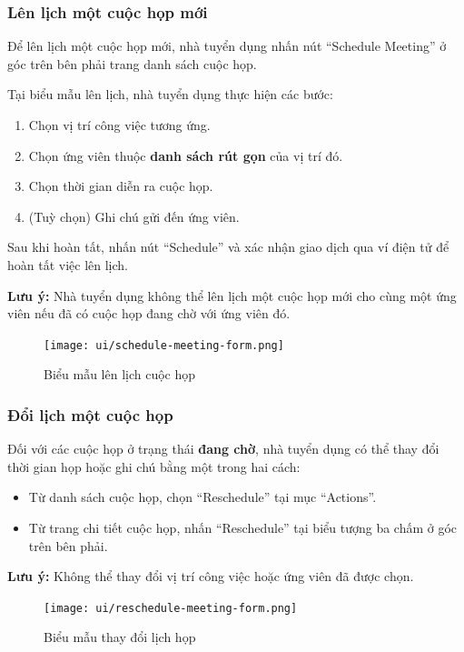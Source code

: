 \subsubsection{Lên lịch một cuộc họp mới}

Để lên lịch một cuộc họp mới, nhà tuyển dụng nhấn nút ``Schedule Meeting'' ở góc trên bên phải trang danh sách cuộc họp.

Tại biểu mẫu lên lịch, nhà tuyển dụng thực hiện các bước:
\begin{enumerate}
  \item Chọn vị trí công việc tương ứng.
  \item Chọn ứng viên thuộc \textbf{danh sách rút gọn} của vị trí đó.
  \item Chọn thời gian diễn ra cuộc họp.
  \item (Tuỳ chọn) Ghi chú gửi đến ứng viên.
\end{enumerate}

Sau khi hoàn tất, nhấn nút ``Schedule'' và xác nhận giao dịch qua ví điện tử để hoàn tất việc lên lịch.

\textbf{Lưu ý:} Nhà tuyển dụng không thể lên lịch một cuộc họp mới cho cùng một ứng viên nếu đã có cuộc họp đang chờ với ứng viên đó.

\begin{figure}[H]
  \centering
  \texttt{[image: ui/schedule-meeting-form.png]}
  \caption{Biểu mẫu lên lịch cuộc họp}
  \label{fig:schedule-meeting-form}
\end{figure}

\subsubsection{Đổi lịch một cuộc họp}

Đối với các cuộc họp ở trạng thái \textbf{đang chờ}, nhà tuyển dụng có thể thay đổi thời gian họp hoặc ghi chú bằng một trong hai cách:
\begin{itemize}
  \item Từ danh sách cuộc họp, chọn ``Reschedule'' tại mục ``Actions''.
  \item Từ trang chi tiết cuộc họp, nhấn ``Reschedule'' tại biểu tượng ba chấm ở góc trên bên phải.
\end{itemize}

\textbf{Lưu ý:} Không thể thay đổi vị trí công việc hoặc ứng viên đã được chọn.

\begin{figure}[H]
  \centering
  \texttt{[image: ui/reschedule-meeting-form.png]}
  \caption{Biểu mẫu thay đổi lịch họp}
  \label{fig:reschedule-meeting-form}
\end{figure}

